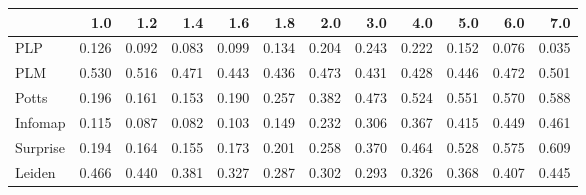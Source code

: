 \begin{tabular}{lrrrrrrrrrrr}
\toprule
{} &   1.0 &   1.2 &   1.4 &   1.6 &   1.8 &   2.0 &   3.0 &   4.0 &   5.0 &   6.0 &   7.0 \\
\midrule
PLP      & 0.126 & 0.092 & 0.083 & 0.099 & 0.134 & 0.204 & 0.243 & 0.222 & 0.152 & 0.076 & 0.035 \\
PLM      & 0.530 & 0.516 & 0.471 & 0.443 & 0.436 & 0.473 & 0.431 & 0.428 & 0.446 & 0.472 & 0.501 \\
Potts    & 0.196 & 0.161 & 0.153 & 0.190 & 0.257 & 0.382 & 0.473 & 0.524 & 0.551 & 0.570 & 0.588 \\
Infomap  & 0.115 & 0.087 & 0.082 & 0.103 & 0.149 & 0.232 & 0.306 & 0.367 & 0.415 & 0.449 & 0.461 \\
Surprise & 0.194 & 0.164 & 0.155 & 0.173 & 0.201 & 0.258 & 0.370 & 0.464 & 0.528 & 0.575 & 0.609 \\
Leiden   & 0.466 & 0.440 & 0.381 & 0.327 & 0.287 & 0.302 & 0.293 & 0.326 & 0.368 & 0.407 & 0.445 \\
\bottomrule
\end{tabular}
